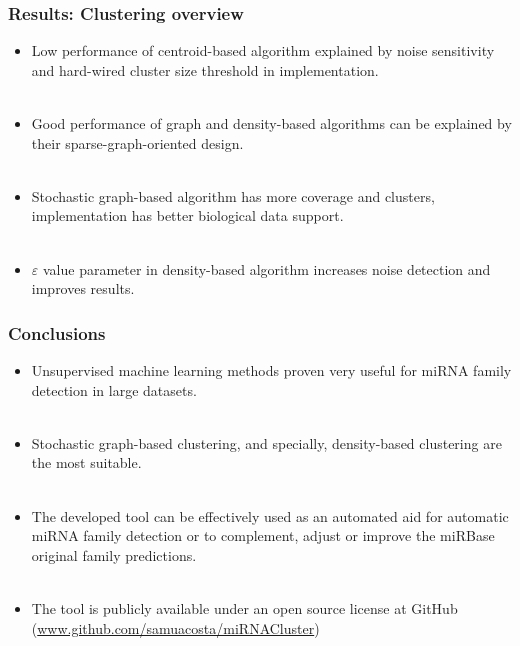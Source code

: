 \documentclass{beamer}
\begin{document}
\begin{frame}
\frametitle{Results: Clustering overview}
\begin{itemize}
\item Low performance of centroid-based algorithm explained by noise sensitivity and hard-wired cluster size threshold in implementation.\\~\\
\item Good performance of graph and density-based algorithms can be explained by their sparse-graph-oriented design.\\~\\
\item Stochastic graph-based algorithm has more coverage and clusters, implementation has better biological data support.\\~\\
\item $\varepsilon$ value parameter in density-based algorithm increases noise detection and improves results.
\end{itemize}
\end{frame}

\begin{frame}
\frametitle{Conclusions}
\begin{itemize}
\item Unsupervised machine learning methods proven very useful for miRNA family detection in large datasets.\\~\\
\item Stochastic graph-based clustering, and specially, density-based clustering are the most suitable.\\~\\
\item The developed tool can be effectively used as an automated aid for automatic miRNA family detection or to complement, adjust or improve the miRBase original family predictions.\\~\\
\item The tool is publicly available under an open source license at GitHub (\href{http://www.github.com/samuacosta/miRNACluster}{www.github.com/samuacosta/miRNACluster})
\end{itemize}
\end{frame}
\end{document}
